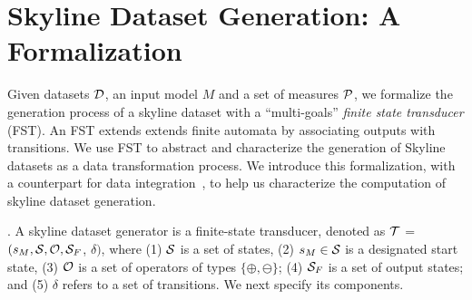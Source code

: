 \section{Skyline Dataset Generation: A Formalization}
\label{sec-system}

Given datasets $\D$, an input 
model $M$ and a set of measures $\P$, 
we formalize the generation process of a 
skyline dataset 
with a ``multi-goals'' {\em finite state transducer} (FST). An FST extends %
extends finite automata by associating outputs with transitions. %
We use FST to abstract and characterize the generation  
of Skyline datasets as a data transformation process. 
We introduce this formalization, with a counterpart 
for data integration~\cite{lenzerini2002data, doan2012principles}, 
to help us characterize the computation 
of skyline 
dataset generation.

. 
A skyline dataset generator 
is a finite-state transducer, 
denoted as $\T$ = $(s_M, \S, \O, \S_F$, $\delta)$,  where (1) $\S$ is a set of states, 
(2) $s_M\in \S$ is a designated start state, 
(3) $\O$ is a set of operators of types $\{\oplus, \ominus\}$; 
(4) $\S_F$ is a set of output states; and 
(5) $\delta$ refers to a set of transitions. 
We next specify its components. 

